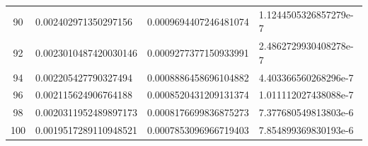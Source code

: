 \documentclass[11pt]{article}
\begin{document}
\begin{tabular}{| c | l | l | l | }
90 & 0.002402971350297156 & 0.0009694407246481074 & 1.1244505326857279e-7 \\ 
92 & 0.0023010487420030146 & 0.0009277377150933991 & 2.4862729930408278e-7 \\ 
94 & 0.002205427790327494 & 0.0008886458696104882 & 4.403366560268296e-7 \\ 
96 & 0.002115624906764188 & 0.0008520431209131374 & 1.011112027438088e-7 \\ 
98 & 0.0020311952489897173 & 0.0008176699836875273 & 7.377680549813803e-6 \\ 
100 & 0.0019517289110948521 & 0.0007853096966719403 & 7.854899369830193e-6 \\  \hline
\end{tabular}
\end{document}

